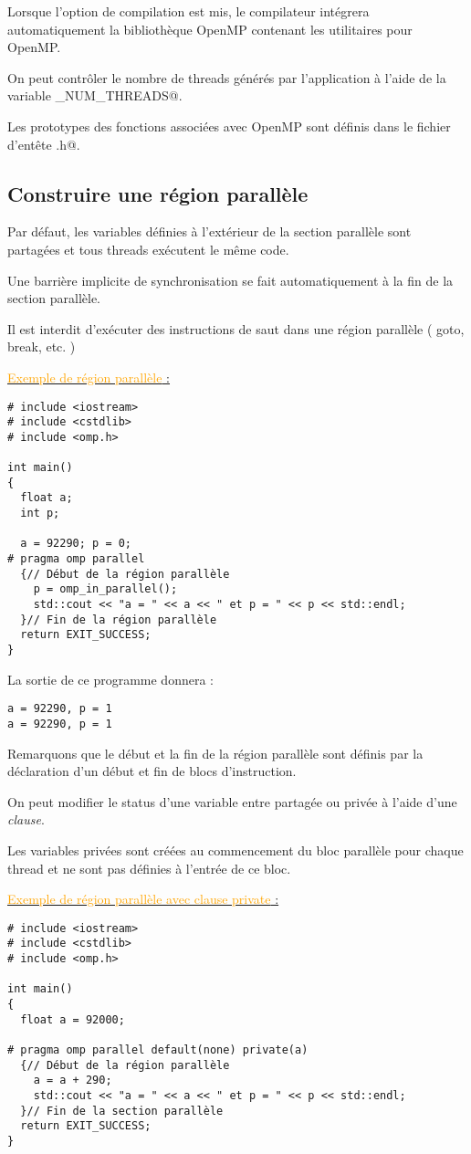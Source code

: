\documentclass[fleqn,11pt]{article}
\begin{document}
Lorsque l'option de compilation est mis, le compilateur intégrera automatiquement la bibliothèque OpenMP contenant les utilitaires pour
OpenMP. 

On peut contrôler le nombre de threads générés par l'application à l'aide de la variable \verb@OMP_NUM_THREADS@.

Les prototypes des fonctions associées avec OpenMP sont définis dans le fichier d'entête \lstinline@omp.h@.

\subsection{Construire une région parallèle}

Par défaut, les variables définies à l'extérieur de la section parallèle
sont partagées et tous threads exécutent le même code.

Une barrière implicite de synchronisation se fait automatiquement à la fin de la section parallèle.

Il est interdit d'exécuter des instructions de saut dans une région parallèle ( goto, break, etc. )

\underline{\textcolor{orange}{Exemple de région parallèle} :}
\begin{lstlisting}
# include <iostream>
# include <cstdlib>
# include <omp.h>

int main()
{
  float a;
  int p;
  
  a = 92290; p = 0;
# pragma omp parallel
  {// Début de la région parallèle
    p = omp_in_parallel();
    std::cout << "a = " << a << " et p = " << p << std::endl;
  }// Fin de la région parallèle
  return EXIT_SUCCESS;
}
\end{lstlisting}

La sortie de ce programme donnera :
\begin{verbatim}
a = 92290, p = 1
a = 92290, p = 1
\end{verbatim}

Remarquons que le début et la fin de la région parallèle sont définis par la déclaration d'un début et fin de blocs
d'instruction.

On peut modifier le status d'une variable entre partagée ou privée à l'aide d'une \textsl{clause}.

Les variables privées sont créées au commencement du bloc parallèle pour chaque thread et ne sont pas définies à l'entrée
de ce bloc.

\underline{\textcolor{orange}{Exemple de région parallèle avec clause private} :}
\begin{lstlisting}
# include <iostream>
# include <cstdlib>
# include <omp.h>

int main()
{
  float a = 92000;
  
# pragma omp parallel default(none) private(a)
  {// Début de la région parallèle
    a = a + 290;
    std::cout << "a = " << a << " et p = " << p << std::endl;
  }// Fin de la section parallèle
  return EXIT_SUCCESS;
}
\end{lstlisting}
\end{document}
